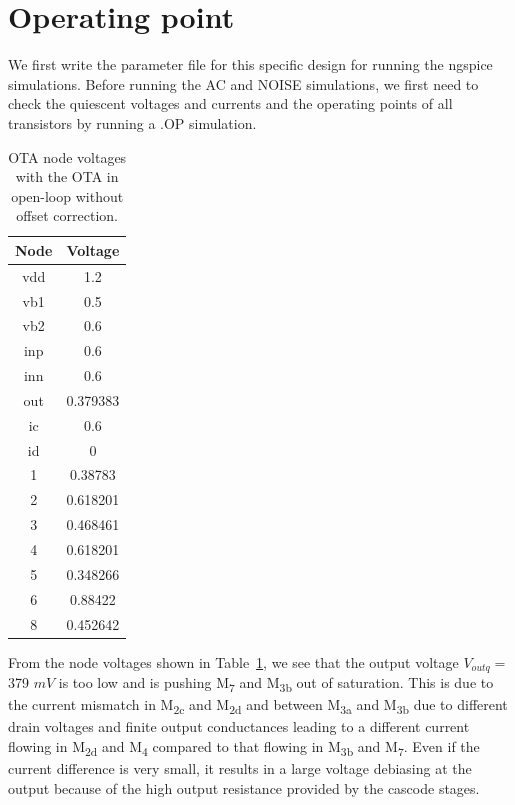\documentclass[
  a4paper,
  DIV=11,
  numbers=noendperiod]{scrreprt}
\begin{document}
\section{Operating point}\label{operating-point}

We first write the parameter file for this specific design for running
the ngspice simulations. Before running the AC and NOISE simulations, we
first need to check the quiescent voltages and currents and the
operating points of all transistors by running a .OP simulation.

\begin{longtable}[]{@{}cc@{}}

\caption{\label{tbl-ng_openloop_voltages1}OTA node voltages with the OTA
in open-loop without offset correction.}

\tabularnewline

\toprule\noalign{}
Node & Voltage \\
\midrule\noalign{}
\endhead
\bottomrule\noalign{}
\endlastfoot
vdd & 1.2 \\
vb1 & 0.5 \\
vb2 & 0.6 \\
inp & 0.6 \\
inn & 0.6 \\
out & 0.379383 \\
ic & 0.6 \\
id & 0 \\
1 & 0.38783 \\
2 & 0.618201 \\
3 & 0.468461 \\
4 & 0.618201 \\
5 & 0.348266 \\
6 & 0.88422 \\
8 & 0.452642 \\

\end{longtable}

From the node voltages shown in Table~\ref{tbl-ng_openloop_voltages1},
we see that the output voltage \(V_{outq} =\) 379 \(mV\) is too low and
is pushing M\textsubscript{7} and M\textsubscript{3b} out of saturation.
This is due to the current mismatch in M\textsubscript{2c} and
M\textsubscript{2d} and between M\textsubscript{3a} and
M\textsubscript{3b} due to different drain voltages and finite output
conductances leading to a different current flowing in
M\textsubscript{2d} and M\textsubscript{4} compared to that flowing in
M\textsubscript{3b} and M\textsubscript{7}. Even if the current
difference is very small, it results in a large voltage debiasing at the
output because of the high output resistance provided by the cascode
stages.
\end{document}
